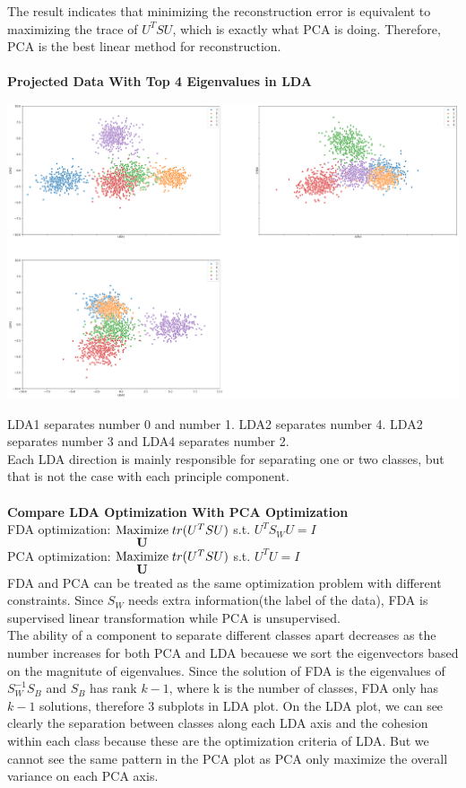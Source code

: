 \documentclass[12pt]{article}
\begin{document}
\noindent
The result indicates that minimizing the reconstruction error is equivalent to maximizing the trace of $U^TSU$, which is exactly what PCA is doing. Therefore, PCA is the best linear method for reconstruction.\\\\
\textbf{Projected Data With Top 4 Eigenvalues in LDA}
\vspace*{-1.0cm}
\begin{center}
    \includegraphics[width=18cm]{../plots/Q2_LDATop3.png}
\end{center}
\noindent
LDA1 separates number 0 and number 1. LDA2 separates number 4. LDA2 separates number 3 and LDA4 separates number 2.\\
Each LDA direction is mainly responsible for separating one or two classes, but that is not the case with each principle component.\\\\
\textbf{Compare LDA Optimization With PCA Optimization}\\
FDA optimization: $\stackunder{Maximize}{\textbf{U}}\;tr(U^TSU)$ s.t. $U^TS_WU=I$\\
PCA optimization: $\stackunder{Maximize}{\textbf{U}}\;tr(U^TSU)$ s.t. $U^TU=I$\\
FDA and PCA can be treated as the same optimization problem with different constraints. Since $S_W$ needs extra information(the label of the data), FDA is supervised linear transformation while PCA is unsupervised.\\
The ability of a component to separate different classes apart decreases as the number increases for both PCA and LDA becauese we sort the eigenvectors based on the magnitute of eigenvalues. Since the solution of FDA is the eigenvalues of $S_W^{-1}S_B$ and $S_B$ has rank $k-1$, where k is the number of classes, FDA only has $k-1$ solutions, therefore 3 subplots in LDA plot. On the LDA plot, we can see clearly the separation between classes along each LDA axis and the cohesion within each class because these are the optimization criteria of LDA. But we cannot see the same pattern in the PCA plot as PCA only maximize the overall variance on each PCA axis.
\end{document}
